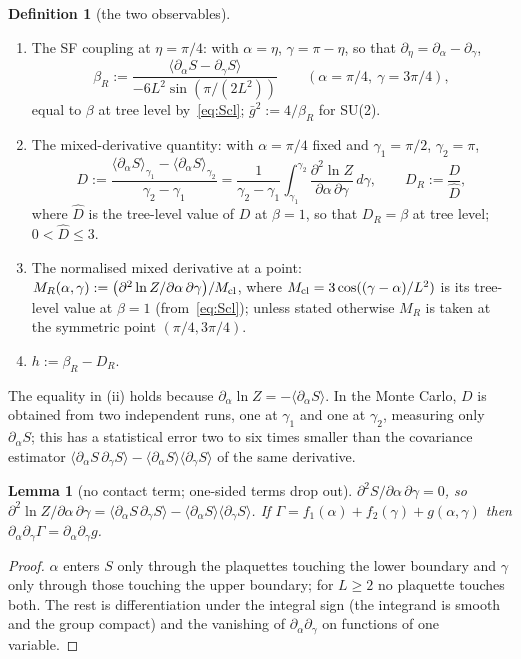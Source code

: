 \documentclass[11pt,a4paper]{article}
\newtheorem{lemma}[theorem]{Lemma}
\theoremstyle{definition}
\newtheorem{definition}[theorem]{Definition}
\theoremstyle{remark}
\newcommand{\gb}{\bar g^{2}}
\newcommand{\bR}{\beta_R}
\newcommand{\DR}{D_R}
\begin{document}
\begin{definition}[the two observables]\label{def:obs}
\begin{enumerate}[label=(\roman*),leftmargin=2em]
\item The SF coupling at $\eta=\pi/4$: with $\alpha=\eta$, $\gamma=\pi-\eta$, so that $\partial_\eta=\partial_\alpha-\partial_\gamma$,
\[
\bR:=\frac{\langle\partial_\alpha S-\partial_\gamma S\rangle}{-6L^2\sin(\pi/(2L^2))}\qquad(\alpha=\pi/4,\ \gamma=3\pi/4),
\]
equal to $\beta$ at tree level by~\eqref{eq:Scl}; $\gb:=4/\bR$ for SU(2).
\item The mixed-derivative quantity: with $\alpha=\pi/4$ fixed and $\gamma_1=\pi/2$, $\gamma_2=\pi$,
\[
D:=\frac{\langle\partial_\alpha S\rangle_{\gamma_1}-\langle\partial_\alpha S\rangle_{\gamma_2}}{\gamma_2-\gamma_1}
=\frac{1}{\gamma_2-\gamma_1}\int_{\gamma_1}^{\gamma_2}\frac{\partial^2\ln Z}{\partial\alpha\,\partial\gamma}\,d\gamma ,
\qquad \DR:=\frac{D}{\hat D},
\]
where $\hat D$ is the tree-level value of $D$ at $\beta=1$, so that $\DR=\beta$ at tree level; $0<\hat D\le3$.
\item The normalised mixed derivative at a point: $M_R(\alpha,\gamma):=\bigl(\partial^2\ln Z/\partial\alpha\,\partial\gamma\bigr)/M_{\rm cl}$, where $M_{\rm cl}=3\cos((\gamma-\alpha)/L^2)$ is its tree-level value at $\beta=1$ (from~\eqref{eq:Scl}); unless stated otherwise $M_R$ is taken at the symmetric point $(\pi/4,3\pi/4)$.
\item $h:=\bR-\DR$.
\end{enumerate}
\end{definition}

The equality in (ii) holds because $\partial_\alpha\ln Z=-\langle\partial_\alpha S\rangle$. In the Monte Carlo, $D$ is obtained from two independent runs, one at $\gamma_1$ and one at $\gamma_2$, measuring only $\partial_\alpha S$; this has a statistical error two to six times smaller than the covariance estimator $\langle\partial_\alpha S\,\partial_\gamma S\rangle-\langle\partial_\alpha S\rangle\langle\partial_\gamma S\rangle$ of the same derivative.

\begin{lemma}[no contact term; one-sided terms drop out]\label{lem:mixed}
$\partial^2 S/\partial\alpha\,\partial\gamma=0$, so $\partial^2\ln Z/\partial\alpha\,\partial\gamma=\langle\partial_\alpha S\,\partial_\gamma S\rangle-\langle\partial_\alpha S\rangle\langle\partial_\gamma S\rangle$. If $\Gamma=f_1(\alpha)+f_2(\gamma)+g(\alpha,\gamma)$ then $\partial_\alpha\partial_\gamma\Gamma=\partial_\alpha\partial_\gamma g$.
\end{lemma}
\begin{proof}
$\alpha$ enters $S$ only through the plaquettes touching the lower boundary and $\gamma$ only through those touching the upper boundary; for $L\ge2$ no plaquette touches both. The rest is differentiation under the integral sign (the integrand is smooth and the group compact) and the vanishing of $\partial_\alpha\partial_\gamma$ on functions of one variable.
\end{proof}
\end{document}

